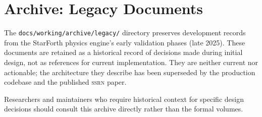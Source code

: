 
\section*{Archive: Legacy Documents}

The \texttt{docs/working/archive/legacy/} directory preserves development
records from the StarForth physics engine's early validation phases (late 2025).
These documents are retained as a historical record of decisions made during
initial design, not as references for current implementation. They are neither
current nor actionable; the architecture they describe has been superseded by
the production codebase and the published \textsc{ssrn} paper.

Researchers and maintainers who require historical context for specific design
decisions should consult this archive directly rather than the formal volumes.
